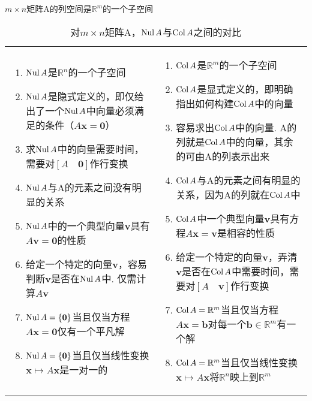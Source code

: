 \begin{TheoremOne}
$m\times n$矩阵A的列空间是$\mathbb{R}^m$的一个子空间
\end{TheoremOne}\vspace{4ex}

{\par\raggedright
{}
\par}\vspace{4ex}

\begin{table}[H]
\caption{对$m\times n$矩阵A，$\Nul A$与$\Col A$之间的对比}
\begin{tabular}{>{\scriptsize}p{6cm}|>{\scriptsize}p{6cm}}
\hline
\multicolumn{1}{c|}{$\Nul A$} & \multicolumn{1}{c}{$\Col A$}\\
\hline
\begin{enumerate}
\item $\Nul A$是$\mathbb{R}^n$的一个子空间
\item $\Nul A$是隐式定义的，即仅给出了一个$\Nul A$中向量必须满足的条件（$A\mathbf{x=0}$）
\item 求$\Nul A$中的向量需要时间，需要对$[A\quad\mathbf{0}]$作行变换
\item $\Nul A$与A的元素之间没有明显的关系
\item $\Nul A$中的一个典型向量$\mathbf{v}$具有$A\mathbf{v=0}$的性质
\item 给定一个特定的向量$\mathbf{v}$，容易判断$\mathbf{v}$是否在$\Nul A$中. 仅需计算$A\mathbf{v}$
\item $\operatorname{Nul} A=\{\mathbf{0}\}$当且仅当方程$A\mathbf{x=0}$仅有一个平凡解
\item $\operatorname{Nul} A=\{\mathbf{0}\}$当且仅当线性变换$\mathbf{x}\mapsto A\mathbf{x}$是一对一的
\end{enumerate} & \begin{enumerate}
\item $\Col A$是$\mathbb{R}^m$的一个子空间
\item $\Col A$是显式定义的，即明确指出如何构建$\Col A$中的向量
\item 容易求出$\Col A$中的向量. A的列就是$\Col A$中的向量，其余的可由A的列表示出来
\item $\Col A$与A的元素之间有明显的关系，因为A的列就在$\Col A$中
\item $\Col A$中一个典型向量$\mathbf{v}$具有方程$A\mathbf{x=v}$是相容的性质
\item 给定一个特定的向量$\mathbf{v}$，弄清$\mathbf{v}$是否在$\Col A$中需要时间，需要对$[A\quad\mathbf{v}]$作行变换
\item $\operatorname{Col} A=\mathbb{R}^m$当且仅当方程$A\mathbf{x=b}$对每一个$\mathbf{b}\in\mathbb{R}^m$有一个解
\item $\operatorname{Col} A=\mathbb{R}^m$当且仅当线性变换$\mathbf{x}\mapsto A\mathbf{x}$将$\mathbb{R}^n$映上到$\mathbb{R}^m$
\end{enumerate}\\
\hline
\end{tabular}
\end{table}\vspace{4ex}

